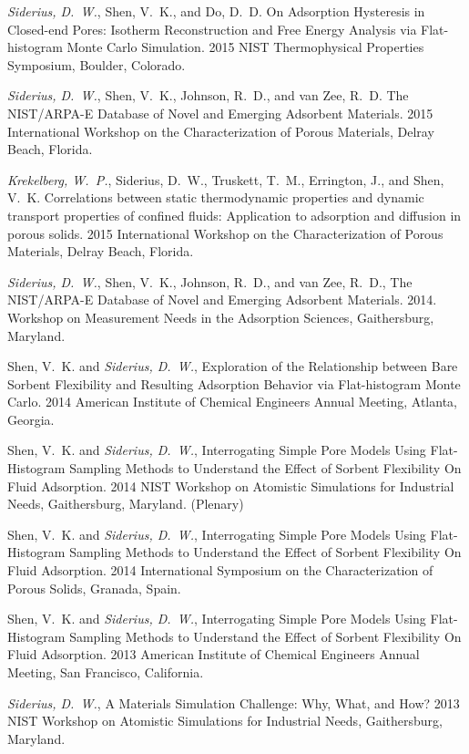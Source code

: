 {\it Siderius, D.~W.}, Shen, V.~K., and Do, D.~D. On Adsorption Hysteresis in Closed-end Pores: Isotherm Reconstruction and Free Energy Analysis via Flat-histogram Monte Carlo Simulation. 2015 NIST Thermophysical Properties Symposium, Boulder, Colorado.

{\it Siderius, D.~W.}, Shen, V.~K., Johnson, R.~D., and van Zee, R.~D. The NIST/ARPA-E Database of Novel and Emerging Adsorbent Materials. 2015 International Workshop on the Characterization of Porous Materials, Delray Beach, Florida.

{\it Krekelberg, W.~P.}, Siderius, D.~W., Truskett, T.~M., Errington, J., and Shen, V.~K. Correlations between static thermodynamic properties and dynamic transport properties of confined fluids: Application to adsorption and diffusion in porous solids. 2015 International Workshop on the Characterization of Porous Materials, Delray Beach, Florida.

{\it Siderius, D.~W.}, Shen, V.~K., Johnson, R.~D., and van Zee, R.~D., The NIST/ARPA-E Database of Novel and Emerging Adsorbent Materials. 2014. Workshop on Measurement Needs in the Adsorption Sciences, Gaithersburg, Maryland.

Shen, V.~K. and {\it Siderius, D.~W.}, Exploration of the Relationship between Bare Sorbent Flexibility and Resulting Adsorption Behavior via Flat-histogram Monte Carlo.
2014 American Institute of Chemical Engineers Annual Meeting, Atlanta, Georgia.

Shen, V.~K. and {\it Siderius, D.~W.}, Interrogating Simple Pore Models Using Flat-Histogram Sampling Methods to Understand the Effect of Sorbent Flexibility On Fluid Adsorption. 2014 NIST Workshop on Atomistic Simulations for Industrial Needs, Gaithersburg, Maryland. (Plenary)

Shen, V.~K. and {\it Siderius, D.~W.}, Interrogating Simple Pore Models Using Flat-Histogram Sampling Methods to Understand the Effect of Sorbent Flexibility On Fluid Adsorption. 2014 International Symposium on the Characterization of Porous Solids, Granada, Spain.

Shen, V.~K. and {\it Siderius, D.~W.}, Interrogating Simple Pore Models Using Flat-Histogram Sampling Methods to Understand the Effect of Sorbent Flexibility On Fluid Adsorption. 2013 American Institute of Chemical Engineers Annual Meeting, San Francisco, California.

{\it Siderius, D.~W.}, A Materials Simulation Challenge: Why, What, and How? 2013 NIST Workshop on Atomistic Simulations for Industrial Needs, Gaithersburg, Maryland.

